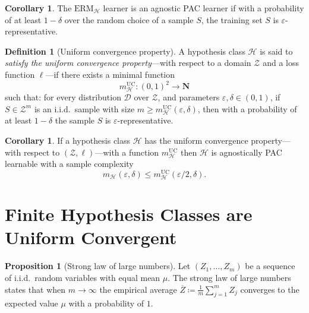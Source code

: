 \documentclass[11pt, reqno]{amsart}
\theoremstyle{definition}
\newtheorem{proposition}[theorem]{Proposition}
\newtheorem{corollary}[theorem]{Corollary}
\newtheorem{definition}[theorem]{Definition}
\renewcommand{\leq}{\leqslant}
\renewcommand{\geq}{\geqslant}
\newcommand{\N}{\mathbf{N}}
\begin{document}
\begin{corollary}
\label{cor:erm-is-agnostic-pac-learner-sufficient-condition}
The \(\text{ERM}_{\mathcal{H}}\) learner is an agnostic PAC learner if with a
probability of at least \(1- \delta\) over the random choice of a sample \(S\),
the training set \(S\) is \(\varepsilon\)-representative.
\end{corollary}

\begin{definition}[Uniform convergence property]
\label{def:learner-uniform-convergence-property}
A hypothesis class \(\mathcal{H}\) is said to \emph{satisfy the uniform convergence
property}---with respect to a domain \(\mathcal{Z}\) and a loss function
\(\ell\)---if there exists a minimal function
\[
m_{\mathcal{H}}^{\text{UC}}: (0, 1)^2 \longrightarrow \N
\]
such that: for every distribution \(\mathcal{D}\) over \(\mathcal{Z}\), and
parameters \(\varepsilon, \delta \in (0, 1)\), if \(S \in \mathcal{Z}^m\) is an
i.i.d.~sample with size
\(m \geq m_{\mathcal{H}}^{\text{UC}}(\varepsilon, \delta)\), then with a
probability of at least \(1 - \delta\) the sample \(S\) is
\(\varepsilon\)-representative.
\end{definition}

\begin{corollary}
\label{cor:unif-conv-hypothesis-is-agnostically-pac-learnable}
If a hypothesis class \(\mathcal{H}\) has the uniform convergence property---with
respect to \((\mathcal{Z}, \ell)\)---with a function
\(m_{\mathcal{H}}^{\text{UC}}\) then \(\mathcal{H}\) is agnostically PAC
learnable with a sample complexity
\[
m_{\mathcal{H}}(\varepsilon, \delta) \leq
m_{\mathcal{H}}^{\text{UC}}(\varepsilon/2, \delta).
\]
\end{corollary}

\section{Finite Hypothesis Classes are Uniform Convergent}

\begin{proposition}[Strong law of large numbers]
\label{prop:strong-law-of-large-numbers}
Let \((Z_1, \dots, Z_m)\) be a sequence of i.i.d.~random variables with equal
mean \(\mu\). The strong law of large numbers states that when \(m \to \infty\)
the empirical average \(\overline Z \coloneq \frac{1}{m} \sum_{j=1}^m Z_j\)
converges to the expected value \(\mu\) with a probability of \(1\).
\end{proposition}
\end{document}
